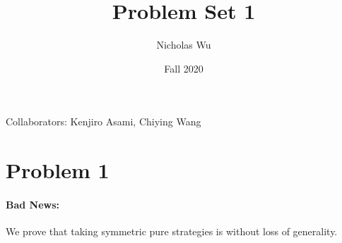 \documentclass[10pt,letter]{article}
\begin{document}


\title{Problem Set 1}

\author{Nicholas Wu}

\date{Fall 2020}

\maketitle

Collaborators: Kenjiro Asami, Chiying Wang
\section*{Problem 1}

\paragraph{Bad News:}

We prove that taking symmetric pure strategies is without loss of generality.
\end{document}
